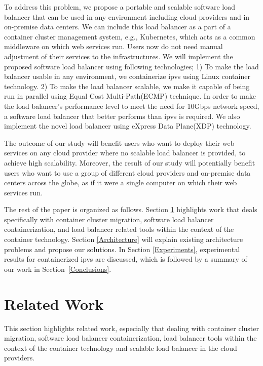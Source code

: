 To address this problem, we propose a portable and scalable software load balancer that can be used in any environment including cloud providers and in on-premise data centers.
We can include this load balancer as a part of a container cluster management system, e.g., Kubernetes\cite{K8s2017}, which acts as a common middleware on which web services run.
Users now do not need manual adjustment of their services to the infrastructures.
We will implement the proposed software load balancer using following technologies;
1) To make the load balancer usable in any environment, we containerize ipvs\cite{Zhang2000} using Linux container technology\cite{menage2007adding}.
2) To make the load balancer scalable, we make it capable of being run in parallel using Equal Cost Multi-Path(ECMP) technique\cite{al2008scalable}.
In order to make the load balancer's performance level to meet the need for 10Gbps network speed, a software load balancer that better performs than ipvs is required.
We also implement the novel load balancer using eXpress Data Plane(XDP) technology\cite{bertin2017xdp}.

The outcome of our study will benefit users who want to deploy their web services on any cloud provider where no scalable load balancer is provided, to achieve high scalability.
Moreover, the result of our study will potentially benefit users who want to use a group of different cloud providers and on-premise data centers across the globe, as if it were a single computer on which their web services run.

The rest of the paper is organized as follows.
Section \ref{Related Work} highlights work that deals specifically with container cluster migration, 
software load balancer containerization, and load balancer related tools within the context of the container technology. 
Section \ref{Architecture} will explain existing architecture problems and propose our solutions.
In Section \ref{Experiments}, experimental results for containerized ipvs are discussed,  
which is followed by a summary of our work in Section~\ref{Conclusions}.

\section{Related Work}\label{Related Work}

This section highlights related work, especially that dealing with container cluster migration, 
software load balancer containerization, load balancer tools within the context of the container technology and scalable load balancer in the cloud providers.

